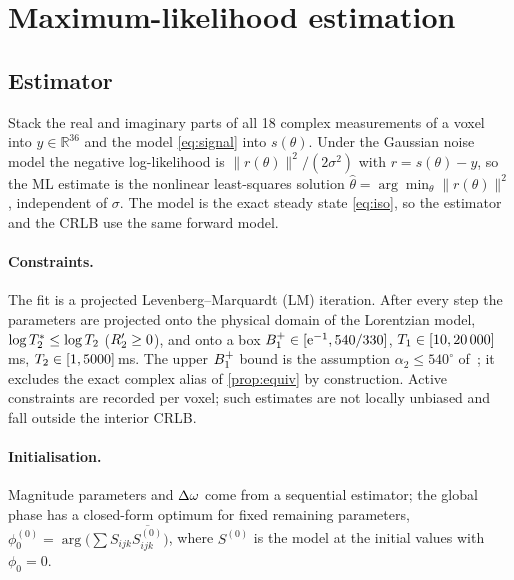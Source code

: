 \section{Maximum-likelihood estimation}\label{sec:ml}

\subsection{Estimator}

Stack the real and imaginary parts of all 18 complex measurements of a voxel into
$y\in\mathbb R^{36}$ and the model \eqref{eq:signal} into $s(\theta)$. Under the Gaussian noise
model the negative log-likelihood is $\|r(\theta)\|^2/(2\sigma^2)$ with $r=s(\theta)-y$, so the ML
estimate is the nonlinear least-squares solution $\hat\theta=\arg\min_\theta\|r(\theta)\|^2$,
independent of $\sigma$. The model is the exact steady state \eqref{eq:iso}, so the estimator
and the CRLB use the same forward model.

\paragraph{Constraints.} The fit is a projected Levenberg--Marquardt (LM) iteration. After
every step the parameters are projected onto the physical domain of the Lorentzian model,
$\log T_2^{*}\le\log T_2$ ($R_2'\ge0$), and onto a box $B_1^{+}\in[\mathrm{e}^{-1},540/330]$,
$T_1\in[10,20\,000]$\,ms, $T_2\in[1,5000]$\,ms. The upper $B_1^{+}$ bound is the assumption
$\alpha_2\le540^\circ$ of~\cite{cheng2019}; it excludes the exact complex alias of
\cref{prop:equiv} by construction. Active constraints are recorded per voxel; such estimates
are not locally unbiased and fall outside the interior CRLB.

\paragraph{Initialisation.} Magnitude parameters and $\Delta\omega$ come from a sequential estimator;
the global phase has a closed-form optimum for fixed remaining parameters,
$\phi_0^{(0)}=\arg\bigl(\sum S_{ijk}\overline{S^{(0)}_{ijk}}\bigr)$, where $S^{(0)}$ is the model at the
initial values with $\phi_0=0$.

